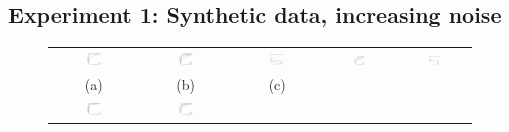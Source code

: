 \documentclass{IEEEtran}
\begin{document}
\subsection{Experiment 1: Synthetic data, increasing noise}
\label{s:experiments_1}
%
\begin{figure}[t]
\centering
\begin{tabular}{@{}c c c c c@{}} %
\includegraphics[width=0.18\textwidth]{figs/synthetic/syn_lines_g2d_noise_cdf} &
\includegraphics[width=0.18\textwidth]{figs/synthetic/syn_lines_g2d_scales_cdf} &
\includegraphics[width=0.18\textwidth]{figs/synthetic/syn_lines_g2d_scales_v_width} &
\includegraphics[width=0.18\textwidth]{figs/retina/ret_vessels_g2d_scales_cdf} &
\includegraphics[width=0.18\textwidth]{figs/retina/ret_vessels_g2d_scales_v_width} \\
(a) & (b) & (c)& &\\
\noalign{\smallskip}
\includegraphics[width=0.18\textwidth]{figs/synthetic/syn_lines_g2d_RF_noise_cdf} &
\includegraphics[width=0.18\textwidth]{figs/synthetic/syn_lines_g2d_RF_scales_cdf} &

\end{tabular}
\end{figure}
\end{document}

